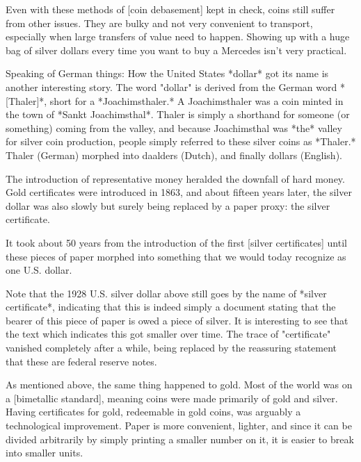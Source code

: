 Even with these methods of [coin debasement] kept in check, coins still
suffer from other issues. They are bulky and not very convenient to
transport, especially when large transfers of value need to happen.
Showing up with a huge bag of silver dollars every time you want to buy
a Mercedes isn't very practical.

Speaking of German things: How the United States *dollar* got its name
is another interesting story. The word "dollar" is derived from the
German word *[Thaler]*, short for a *Joachimsthaler.* A Joachimsthaler
was a coin minted in the town of *Sankt Joachimsthal*. Thaler is simply
a shorthand for someone (or something) coming from the valley, and
because Joachimsthal was *the* valley for silver coin production, people
simply referred to these silver coins as *Thaler.* Thaler (German)
morphed into daalders (Dutch), and finally dollars (English).


The introduction of representative money heralded the downfall of hard
money. Gold certificates were introduced in 1863, and about fifteen
years later, the silver dollar was also slowly but surely being replaced
by a paper proxy: the silver certificate.

It took about 50 years from the introduction of the first [silver
certificates] until these pieces of paper morphed into something that we
would today recognize as one U.S. dollar.


Note that the 1928 U.S. silver dollar above still goes by the name of
*silver certificate*, indicating that this is indeed simply a document
stating that the bearer of this piece of paper is owed a piece of
silver. It is interesting to see that the text which indicates this got
smaller over time. The trace of "certificate" vanished completely after
a while, being replaced by the reassuring statement that these are
federal reserve notes.

As mentioned above, the same thing happened to gold. Most of the world
was on a [bimetallic standard], meaning coins were made primarily of
gold and silver. Having certificates for gold, redeemable in gold coins,
was arguably a technological improvement. Paper is more convenient,
lighter, and since it can be divided arbitrarily by simply printing a
smaller number on it, it is easier to break into smaller units.

